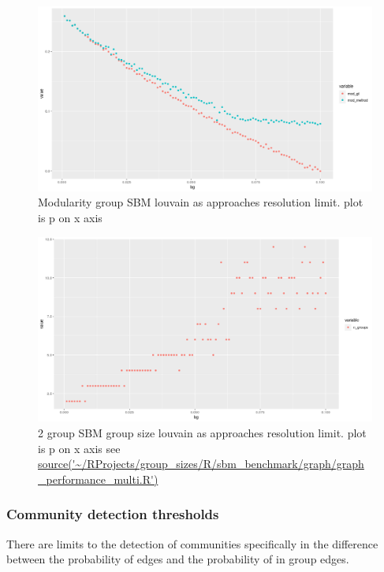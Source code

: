 \begin{figure}
    \centering
    \includegraphics[width=\textwidth]{images/Rplot_rough_modularity_lou_ground_truth.png}
    \caption{Modularity group SBM louvain as approaches resolution limit. plot is p on x axis}
    \label{fig:my_rough_louvain modularity}
\end{figure}


\begin{figure}
    \centering
    \includegraphics[width=\textwidth]{images/Rplot_group_size_rough_louvain_sbm.png}
    \caption{2 group SBM group size louvain as approaches resolution limit. plot is p on x axis see \url{source('~/RProjects/group_sizes/R/sbm_benchmark/graph/graph_performance_multi.R')}}
    \label{fig:my_rough_louvain group size}
\end{figure}

\subsubsection{Community detection thresholds}
\label{sec:community detection thresholds}
There are limits to the detection of communities specifically in the difference between the probability of edges and the probability of in group edges.

